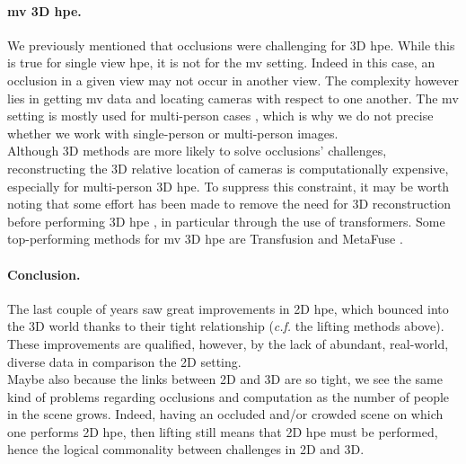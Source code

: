 \documentclass[runningheads]{llncs}
\begin{document}
\paragraph{\ac{mv} 3D \ac{hpe}.}
We previously mentioned that occlusions were challenging for 3D \ac{hpe}. While this is true for single view \ac{hpe}, it is not for the \ac{mv} setting. Indeed in this case, an occlusion in a given view may not occur in another view. The complexity however lies in getting \ac{mv} data and locating cameras with respect to one another. The \ac{mv} setting is mostly used for multi-person cases \cite{survey}, which is why we do not precise whether we work with single-person or multi-person images. \\
Although 3D methods are more likely to solve occlusions' challenges, reconstructing the 3D relative location of cameras is computationally expensive, especially for multi-person 3D \ac{hpe}. To suppress this constraint, it may be worth noting that some effort has been made to remove the need for 3D reconstruction before performing 3D \ac{hpe} \cite{Multi-view Pose transformer}, in particular through the use of transformers. Some top-performing methods for \ac{mv} 3D \ac{hpe} are Transfusion \cite{Transfusion} and MetaFuse \cite{MetaFuse}.

\paragraph{Conclusion.} The last couple of years saw great improvements in 2D \ac{hpe}, which bounced into the 3D world thanks to their tight relationship (\textit{c.f.} the lifting methods above). These improvements are qualified, however, by the lack of abundant, real-world, diverse data in comparison the 2D setting. \\
Maybe also because the links between 2D and 3D are so tight, we see the same kind of problems regarding occlusions and computation as the number of people in the scene grows. Indeed, having an occluded and/or crowded scene on which one performs 2D \ac{hpe}, then lifting still means that 2D \ac{hpe} must be performed, hence the logical commonality between challenges in 2D and 3D.
\end{document}
